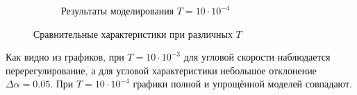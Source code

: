 \documentclass[a4paper, 11pt]{article}
\begin{document}
\begin{figure}[h!]
\begin{subfigure}{0.5\textwidth}
		\caption{Результаты моделирования $T = 10\cdot10^{-4}$}
    \end{subfigure}
    \caption{Сравнительные характеристики при различных $T$}
\end{figure}

\par 
Как видно из графиков, при $T = 10\cdot10^{-3}$ для угловой скорости наблюдается перерегулирование, а для угловой характеристики небольшое отклонение $\Delta\alpha = 0.05$. При $T = 10\cdot10^{-4}$ графики полной и упрощённой моделей совпадают.
\end{document}
